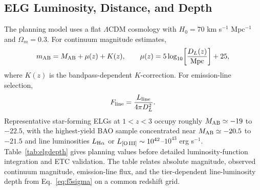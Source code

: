 \subsection{ELG Luminosity, Distance, and Depth}\label{sec:elgdepth}

The planning model uses a flat $\Lambda$CDM cosmology with $H_0=70$ km s$^{-1}$ Mpc$^{-1}$ and $\Omega_m=0.3$. For continuum magnitude estimates,
\begin{equation}
  m_{\rm AB}=M_{\rm AB}+\mu(z)+K(z), \qquad
  \mu(z)=5\log_{10}\!\left[\frac{D_L(z)}{\rm Mpc}\right]+25,
\end{equation}
where $K(z)$ is the bandpass-dependent $K$-correction. For emission-line selection,
\begin{equation}
  F_{\rm line}=\frac{L_{\rm line}}{4\pi D_L^2}.
\end{equation}
Representative star-forming ELGs at $1<z<3$ occupy roughly $M_{\rm AB}\simeq-19$ to $-22.5$, with the highest-yield BAO sample concentrated near $M_{\rm AB}\simeq-20.5$ to $-21.5$ and line luminosities $L_{\rm H\alpha}$ or $L_{\rm [O\,III]}\sim10^{42}$--$10^{43}$ erg s$^{-1}$. Table~\ref{tab:elgdepth} gives planning values before detailed luminosity-function integration and ETC validation. The table relates absolute magnitude, observed continuum magnitude, emission-line flux, and the tier-dependent line-luminosity depth from Eq.~\eqref{eq:f5sigma} on a common redshift grid.

